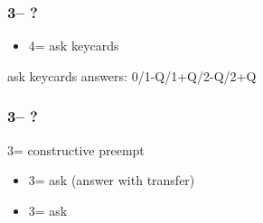 \documentclass[12pt, a4paper]{report}
\begin{document}
{{        \subsubsection*{3\major -- ?}
        \begin{itemize}
            \item 4\clubs = ask keycards
        \end{itemize}

        \vspace{0.5cm}
        ask keycards answers: 0/1-Q/1+Q/2-Q/2+Q
        \vspace{0.4cm}

        \subsubsection*{3\nt -- ?}
        3\nt = constructive \major preempt
        \begin{itemize}
            \item 3\clubs = ask (answer with transfer)
            \item 3\diams = ask
        \end{itemize}
    }

}
\end{document}
